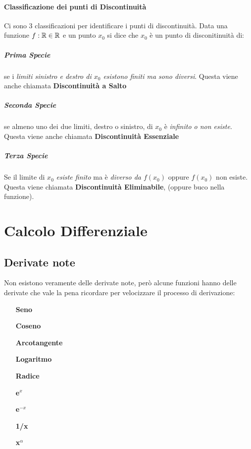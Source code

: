 \documentclass[12pt, a4paper, openany]{book}
\begin{document}
	\subsubsection*{Classificazione dei punti di Discontinuità}
	Ci sono 3 classificazioni per identificare i punti di discontinuità.
	Data una funzione $f:\mathbb{R} \in \mathbb{R}$ e un punto $x_0$ si dice che $x_0$ è un punto di disconitinuità di:
	\paragraph{Prima Specie} se i \emph{limiti sinistro e destro di $x_0$ esistono finiti ma sono diversi}.
	Questa viene anche chiamata \textbf{Discontinuità a Salto}
	\paragraph{Seconda Specie} se almeno uno dei due limiti, destro o sinistro, di $x_0$ è \emph{infinito o non esiste}.
	Questa viene anche chiamata \textbf{Discontinuità Essenziale}
	\paragraph{Terza Specie} Se il limite di $x_0$ \emph{esiste finito} ma è \emph{diverso da $f(x_0)$} oppure $f(x_0)$ non esiste.
	Questa viene chiamata \textbf{Discontinuità Eliminabile}, (oppure buco nella funzione).


	\chapter{Calcolo Differenziale}

	\section{Derivate note}
	Non esistono veramente delle derivate note, però alcune funzioni hanno delle derivate che vale la pena ricordare per velocizzare il processo di derivazione:

	\begin{itemize}
		\item[\textbf{Seno}] 
		\item[\textbf{Coseno}] 
		\item[\textbf{Arcotangente}] 
		\item[\textbf{Logaritmo}] 
		\item[\textbf{Radice}] 
		\item[\textbf{e$^x$}] 
		\item[\textbf{e$^{-x}$}] 
		\item[\textbf{1/x}] 
		\item[\textbf{x$^\alpha$}] 
	\end{itemize}
\end{document}
